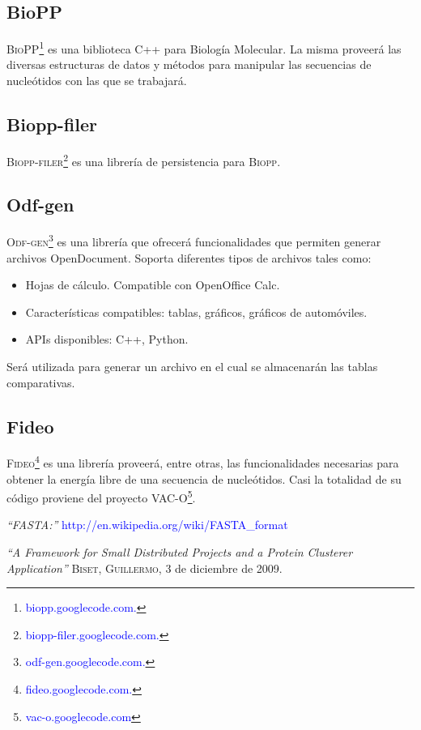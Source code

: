 \documentclass[12pt,a4paper,spanish]{article}
\begin{document}
	\subsection{BioPP}
		\par \textsc{BioPP}\footnote{\textcolor{blue}{biopp.googlecode.com.}} es una biblioteca C++ para Biología Molecular. La misma proveerá las 			diversas estructuras de datos y métodos para manipular las secuencias de nucleótidos con las que se trabajará. 		

	\subsection{Biopp-filer}
		 \par \textsc{Biopp-filer}\footnote{\textcolor{blue}{biopp-filer.googlecode.com.}} es una librería de persistencia para \textsc{Biopp}. 

	\subsection{Odf-gen}
		\textsc{Odf-gen}\footnote{\textcolor{blue}{odf-gen.googlecode.com.}} es una librería que ofrecerá funcionalidades que permiten generar archivos 			OpenDocument. Soporta diferentes tipos de archivos tales como:
		\begin{itemize}
			\item Hojas de cálculo. Compatible con OpenOffice Calc.
			\item Características compatibles: tablas, gráficos, gráficos de automóviles.
			\item APIs disponibles: C++, Python.
		\end{itemize}
		 \par Será utilizada para generar un archivo en el cual se almacenarán las tablas comparativas.	
		 
	\subsection{Fideo}
			\textsc{Fideo}\footnote{\textcolor{blue}{fideo.googlecode.com.}} es una librería proveerá, entre otras, las funcionalidades necesarias para 			obtener la energía libre de una secuencia de nucleótidos. Casi la totalidad de su código proviene del proyecto VAC-O\footnote{\textcolor{blue}{vac-o.googlecode.com}}. 						

\begin{thebibliography}{99}
\small	{} {\em{“FASTA:”}} \textcolor{blue}{http://en.wikipedia.org/wiki/FASTA\_format}

\small	{} {\em{“A Framework for Small Distributed Projects and a Protein Clusterer Application”}}
			\textsc{Biset, Guillermo}, 3 de diciembre de 2009.
\end{thebibliography}
\end{document}

